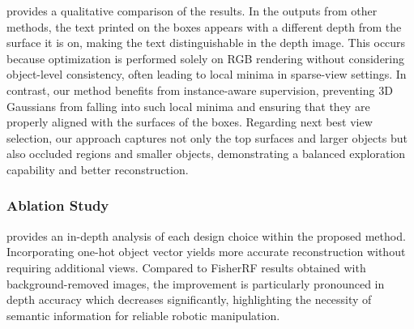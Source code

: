  provides a qualitative comparison of the results. In the outputs from other methods, the text printed on the boxes appears with a different depth from the surface it is on, making the text distinguishable in the depth image. This occurs because optimization is performed solely on RGB rendering without considering object-level consistency, often leading to local minima in sparse-view settings. In contrast, our method benefits from instance-aware supervision, preventing 3D Gaussians from falling into such local minima and ensuring that they are properly aligned with the surfaces of the boxes. Regarding next best view selection, our approach captures not only the top surfaces and larger objects but also occluded regions and smaller objects, demonstrating a balanced exploration capability and better reconstruction.



% 
% 

\subsubsection{Ablation Study}

 provides an in-depth analysis of each design choice within the proposed method. Incorporating one-hot object vector yields more accurate reconstruction without requiring additional views. Compared to FisherRF results obtained with background-removed images, the improvement is particularly pronounced in depth accuracy which decreases significantly, highlighting the necessity of semantic information for reliable robotic manipulation.



